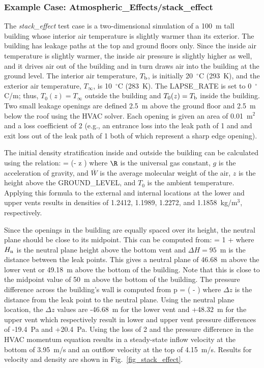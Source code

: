 \documentclass[11pt]{book}
\begin{document}
\subsubsection{Example Case: Atmospheric\_Effects/stack\_effect}

The {\em stack\_effect} test case is a two-dimensional simulation of a 100~m tall building whose interior air temperature is slightly warmer than its exterior. The building has leakage paths at the top and ground floors only. Since the inside air temperature is slightly warmer, the inside air pressure is slightly higher as well, and it drives air out of the building and in turn draws air into the building at the ground level.
The interior air temperature, $T_{\rm b}$, is initially 20~$^\circ$C (293~K), and the exterior air temperature, $T_\infty$, is
10~$^\circ$C (283~K). The {\ct LAPSE\_RATE} is set to 0~$^\circ$C/m; thus, $T_0(z)=T_\infty$ outside the building and $T_0(z)=T_{\rm b}$ inside the building. Two small leakage openings are defined 2.5~m above the ground floor and 2.5~m below the roof using the HVAC solver. Each opening is given an area of 0.01~m$^2$ and a loss coefficient of 2 (e.g., an entrance loss into the leak path of 1 and and exit loss out of the leak path of 1 both of which represent a sharp edge opening).

The initial density stratification inside and outside the building can be calculated using the relation:
\be
   = \exp \left(-  z \right)
\ee
where $\R$ is the universal gas constant, $g$ is the acceleration of gravity, and $\overline{W}$ is the average molecular weight of the air, $z$ is the height above the {\ct GROUND\_LEVEL}, and $T_0$ is the ambient temperature. Applying this formula to the external and internal locations at the lower and upper vents results in densities of 1.2412, 1.1989, 1.2272, and 1.1858~kg/m$^3$, respectively.

Since the openings in the building are equally spaced over its height, the neutral plane should be close to its midpoint. This can be computed from:
\be
   = 1 + 
\ee
where $H_{\rm n}$ is the neutral plane height above the bottom vent and $\Delta H=95$~m is the distance between the leak points. This gives a neutral plane of 46.68~m above the lower vent or 49.18~m above the bottom of the building. Note that this is close to the midpoint value of 50~m above the bottom of the building. The pressure difference across the building's wall is computed from
\be
   \Delta p =  \R \left(  -  \right)
\ee
where $ \Delta z$ is the distance from the leak point to the neutral plane.  Using the neutral plane location, the $ \Delta z$ values are -46.68~m for the lower vent and +48.32~m for the upper vent which respectively result in lower and upper vent pressure differences of -19.4~Pa and +20.4~Pa.  Using the loss of 2 and the pressure difference in the HVAC momentum equation results in a steady-state inflow velocity at the bottom of 3.95~m/s and an outflow velocity at the top of 4.15~m/s. Results for velocity and density are shown in Fig.~\ref{fig_stack_effect}.
\end{document}

